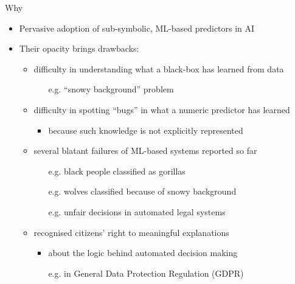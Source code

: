 \documentclass[presentation]{beamer}\mode<presentation>{\usetheme{AMSBolognaFC}}
\begin{document}
\begin{frame}[c]{Why}
    \begin{itemize}
        \item Pervasive adoption of \alert{sub-symbolic}, ML-based predictors in AI
        
        \vfill

        \item Their \alert{opacity} brings \alert{drawbacks}:
        \vfill
        \begin{itemize}\small
            \item difficulty in \alert{understanding} what a black-box has learned from data
            \begin{itemize}\tiny
                \item[e.g.] ``snowy background'' problem
            \end{itemize}
            
            \vfill
            
            \item difficulty in spotting ``\alert{bugs}'' in what a numeric predictor has learned
            \begin{itemize}\tiny
                \item because such knowledge is not explicitly represented
            \end{itemize}
            
            \vfill
            
            \item several blatant \alert{failures} of ML-based systems reported so far
            \begin{itemize}\tiny
                \item[e.g.] black people classified as gorillas 
                \item[e.g.] wolves classified because of snowy background 
                \item[e.g.] unfair decisions in automated legal systems 
            \end{itemize}
            
            \vfill
            
            \item recognised citizens' \alert{right} to meaningful \alert{explanations} 
            \begin{itemize}\tiny
                \item about the \alert{logic} behind automated decision making
                \item[e.g.] in General Data Protection Regulation (\alert{GDPR}) 
            \end{itemize}
        \end{itemize}


\end{itemize}
\end{frame}
\end{document}
